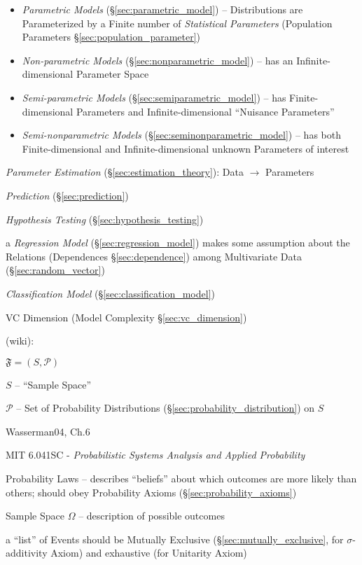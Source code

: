 \begin{itemize}
  \item \emph{Parametric Models} (\S\ref{sec:parametric_model}) -- Distributions
    are Parameterized by a Finite number of \emph{Statistical Parameters}
    (Population Parameters \S\ref{sec:population_parameter})
  \item \emph{Non-parametric Models} (\S\ref{sec:nonparametric_model})
    -- has an Infinite-dimensional Parameter Space
  \item \emph{Semi-parametric Models} (\S\ref{sec:semiparametric_model}) -- has
    Finite-dimensional Parameters and Infinite-dimensional
    ``Nuisance Parameters''
  \item \emph{Semi-nonparametric Models} (\S\ref{sec:seminonparametric_model})
    -- has both Finite-dimensional and Infinite-dimensional unknown Parameters
    of interest
\end{itemize}

\emph{Parameter Estimation} (\S\ref{sec:estimation_theory}): Data $\rightarrow$
Parameters

\emph{Prediction} (\S\ref{sec:prediction})

\emph{Hypothesis Testing} (\S\ref{sec:hypothesis_testing})

\fist a \emph{Regression Model} (\S\ref{sec:regression_model}) makes some
assumption about the Relations (Dependences \S\ref{sec:dependence}) among
Multivariate Data (\S\ref{sec:random_vector})

\fist \emph{Classification Model} (\S\ref{sec:classification_model})

VC Dimension (Model Complexity \S\ref{sec:vc_dimension})

(wiki):

$\mathfrak{F} = (S, \mathcal{P})$

$S$ -- ``Sample Space''

$\mathcal{P}$ -- Set of Probability Distributions
(\S\ref{sec:probability_distribution}) on $S$

Wasserman04, Ch.6

\asterism

MIT 6.041SC - \emph{Probabilistic Systems Analysis and Applied Probability}

Probability Laws -- describes ``beliefs'' about which outcomes are more likely
than others; should obey Probability Axioms (\S\ref{sec:probability_axioms})

Sample Space $\Omega$ -- description of possible outcomes

a ``list'' of Events should be Mutually Exclusive
(\S\ref{sec:mutually_exclusive}, for $\sigma$-additivity Axiom) and exhaustive
(for Unitarity Axiom)

